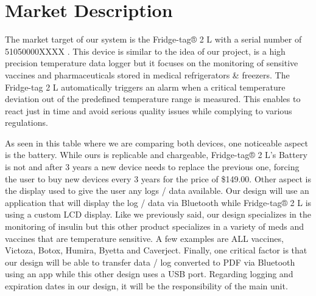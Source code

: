 \section{Market Description}
The market target of our system is the Fridge-tag® 2 L with a serial number of 51050000XXXX \cite{RefrigeratorTemperatureMonitoring}. This device is similar to the idea of our project, is a high precision temperature data logger but it focuses on the monitoring of sensitive vaccines and pharmaceuticals stored in medical refrigerators & freezers. The Fridge-tag 2 L automatically triggers an alarm when a critical temperature deviation out of the predefined temperature range is measured. This enables to react just in time and avoid serious quality issues while complying to various regulations.

As seen in this table where we are comparing both devices, one noticeable aspect is the battery. While ours is replicable and chargeable, Fridge-tag® 2 L's Battery is not and after 3 years a new device needs to replace the previous one, forcing the user to buy new devices every 3 years for the price of \$149.00. Other aspect is the display used to give the user any logs / data available. Our design will use an application that will display the log / data via Bluetooth while Fridge-tag® 2 L is using a custom LCD display. Like we previously said, our design specializes in the monitoring of insulin but this other product specializes in a variety of meds and vaccines that are temperature sensitive. A few examples are ALL vaccines, Victoza, Botox, Humira, Byetta and Caverject. Finally, one critical factor is that our design will be able to transfer data / log converted to PDF via Bluetooth using an app while this other design uses a USB port. Regarding logging and expiration dates in our design, it will be the responsibility of the main unit. 

